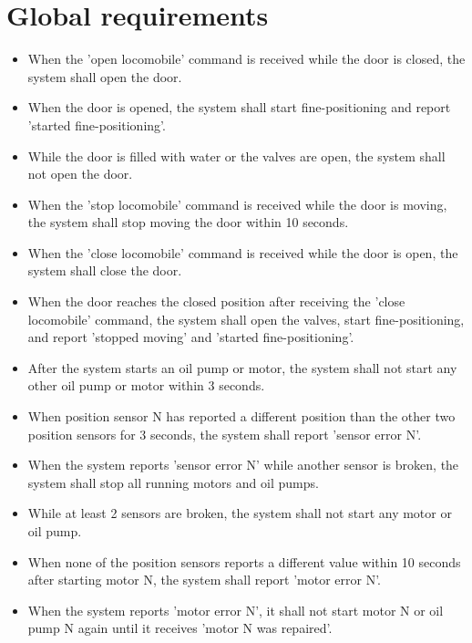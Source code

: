 \documentclass{article}
\begin{document}
\section{Global requirements}
\begin{itemize}
    \item When the 'open locomobile' command is received while the door is closed,
    the system shall open the door.
    \item When the door is opened, the system shall start fine-positioning and
    report 'started fine-positioning'.
    \item While the door is filled with water or the valves are open, the system 
    shall not open the door.

    \item When the 'stop locomobile' command is received while the door is moving,
    the system shall stop moving the door within 10 seconds.

    \item When the 'close locomobile' command is received while the door is open,
    the system shall close the door.
    \item When the door reaches the closed position after receiving the 
    'close locomobile' command, the system shall open the valves, 
    start fine-positioning, and report 'stopped moving' and 'started fine-positioning'.

    \item After the system starts an oil pump or motor, the system shall not start
    any other oil pump or motor within 3 seconds.
    \item When position sensor N has reported a different position than the other two
    position sensors for 3 seconds, the system shall report 'sensor error N'.
    \item When the system reports 'sensor error N' while another sensor is broken, the
    system shall stop all running motors and oil pumps.
    \item While at least 2 sensors are broken, the system shall not start any motor or
    oil pump.

    \item When none of the position sensors reports a different value within 10 seconds 
    after starting motor N, the system shall report 'motor error N'.
    \item When the system reports 'motor error N', it shall not start motor N or oil pump
    N again until it receives 'motor N was repaired'.
\end{itemize}
\end{document}
